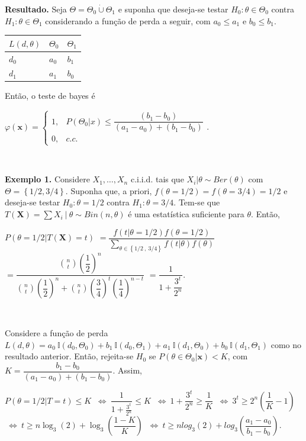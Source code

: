 \documentclass[
]{book}
\begin{document}
\textbf{Resultado.} Seja \(\Theta=\Theta_0 \dot{\cup} \Theta_1\) e suponha que deseja-se testar \(H_0: \theta \in \Theta_0\) contra \(H_1: \theta \in \Theta_1\) considerando a função de perda a seguir, com \(a_0 \leq a_1\) e \(b_0 \leq b_1\).

\begin{tabular}{lll}
\toprule
$L(d,\theta)$ & $\Theta_0$ & $\Theta_1$\\
\midrule
$d_0$ & $a_0$ & $b_1$\\
$d_1$ & $a_1$ & $b_0$\\
\bottomrule
\end{tabular}

Então, o teste de bayes é

\({\varphi}(\boldsymbol x)=\left\{\begin{array}{rl} 1,& P(\Theta_0|x) \leq \dfrac{(b_1-b_0)}{(a_1-a_0)+(b_1-b_0)} \\ 0,& c.c.\end{array}\right.\).

\(~\)

\textbf{Exemplo 1.} Considere \(X_1,\ldots,X_n\) c.i.i.d. tais que \(X_i|\theta \sim Ber(\theta)\) com \(\Theta = \left\{1/2,3/4\right\}\). Suponha que, a priori, \(f(\theta=1/2)=f(\theta=3/4)=1/2\) e deseja-se testar \(H_0: \theta=1/2\) contra \(H_1: \theta=3/4\). Tem-se que \(T(\boldsymbol X)=\sum X_i~|~\theta\sim Bin(n,\theta)\) é uma estatística suficiente para \(\theta\). Então,

\(P(\theta=1/2|T(\boldsymbol X)=t)\) \(=\dfrac{f(t|\theta=1/2)f(\theta=1/2)}{\displaystyle\sum_{\theta \in \left\{1/2~,~3/4\right\}} f(t|\theta)f(\theta)}\) \(=\dfrac{\displaystyle\binom{n}{t}\left(\dfrac{1}{2}\right)^n}{\displaystyle\binom{n}{t}\left(\dfrac{1}{2}\right)^n+\binom{n}{t}\left(\dfrac{3}{4}\right)^t\left(\dfrac{1}{4}\right)^{n-t}}\) \(=\dfrac{1}{1+\dfrac{3^t}{2^n}}\).

\(~\)

Considere a função de perda \(L(d,\theta) = a_0~\mathbb{I}(d_0,\Theta_0) + b_1~\mathbb{I}(d_0,\Theta_1) + a_1~\mathbb{I}(d_1,\Theta_0) + b_0~\mathbb{I}(d_1,\Theta_1)\) como no resultado anterior. Então, rejeita-se \(H_0\) se \(P(\theta \in \Theta_0 | \boldsymbol x) < K\), com \(K = \dfrac{b_1-b_0}{(a_1-a_0)+(b_1-b_0)}\). Assim,

\(P(\theta=1/2|T=t)\leq K\)
\(~\Longleftrightarrow~ \dfrac{1}{1+\frac{3^t}{2^n}} \leq K\)
\(~\Longleftrightarrow~ {1+\dfrac{3^t}{2^n}} \geq \dfrac{1}{K}\)
\(~\Longleftrightarrow~ 3^t\geq 2^n\left(\dfrac{1}{K}-1\right)\)
\(~\Longleftrightarrow~ t\geq n\log_3(2)+\log_3\left(\dfrac{1-K}{K}\right)\) \(~\Longleftrightarrow~ t\geq nlog_3(2)+log_3\left(\dfrac{a_1-a_0}{b_1-b_0}\right)\).
\end{document}
